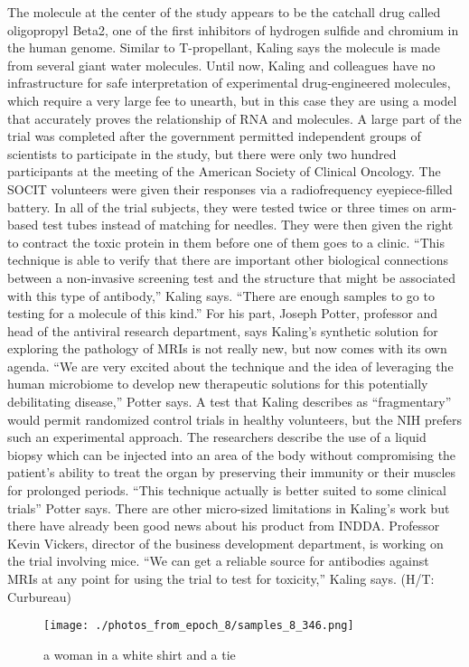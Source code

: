 \documentclass{article}%
\begin{document}
The molecule at the center of the study appears to be the catchall drug called oligopropyl Beta2, one of the first inhibitors of hydrogen sulfide and chromium in the human genome. Similar to T{-}propellant, Kaling says the molecule is made from several giant water molecules.\newline%
Until now, Kaling and colleagues have no infrastructure for safe interpretation of experimental drug{-}engineered molecules, which require a very large fee to unearth, but in this case they are using a model that accurately proves the relationship of RNA and molecules. A large part of the trial was completed after the government permitted independent groups of scientists to participate in the study, but there were only two hundred participants at the meeting of the American Society of Clinical Oncology.\newline%
The SOCIT volunteers were given their responses via a radiofrequency eyepiece{-}filled battery. In all of the trial subjects, they were tested twice or three times on arm{-}based test tubes instead of matching for needles. They were then given the right to contract the toxic protein in them before one of them goes to a clinic.\newline%
“This technique is able to verify that there are important other biological connections between a non{-}invasive screening test and the structure that might be associated with this type of antibody,” Kaling says.\newline%
“There are enough samples to go to testing for a molecule of this kind.”\newline%
For his part, Joseph Potter, professor and head of the antiviral research department, says Kaling’s synthetic solution for exploring the pathology of MRIs is not really new, but now comes with its own agenda.\newline%
“We are very excited about the technique and the idea of leveraging the human microbiome to develop new therapeutic solutions for this potentially debilitating disease,” Potter says.\newline%
A test that Kaling describes as “fragmentary” would permit randomized control trials in healthy volunteers, but the NIH prefers such an experimental approach. The researchers describe the use of a liquid biopsy which can be injected into an area of the body without compromising the patient’s ability to treat the organ by preserving their immunity or their muscles for prolonged periods.\newline%
“This technique actually is better suited to some clinical trials” Potter says.\newline%
There are other micro{-}sized limitations in Kaling’s work but there have already been good news about his product from INDDA.\newline%
Professor Kevin Vickers, director of the business development department, is working on the trial involving mice. “We can get a reliable source for antibodies against MRIs at any point for using the trial to test for toxicity,” Kaling says.\newline%
(H/T: Curbureau)\newline%

%


\begin{figure}[h!]%
\centering%
\texttt{[image: ./photos\_from\_epoch\_8/samples\_8\_346.png]}%
\caption{a woman in a white shirt and a tie}%
\end{figure}

%
\end{document}
